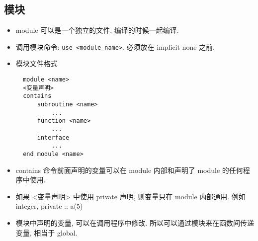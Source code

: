 \subsection{模块}

\begin{itemize}
\item module 可以是一个独立的文件, 编译的时候一起编译.
\item 调用模块命令:  \verb|use <module_name>|.  必须放在 implicit none 之前.
\item 模块文件格式
\begin{lstlisting}
  module <name>
  <变量声明>
  contains
      subroutine <name>
          ...
      function <name>
          ...
      interface
          ...
  end module <name>
\end{lstlisting}
\item contains 命令前面声明的变量可以在 module 内部和声明了 module 的任何程序中使用.
\item 如果 <变量声明> 中使用 private 声明, 则变量只在 module 内部通用. 例如
   integer, private :: a(5)
\item 模块中声明的变量, 可以在调用程序中修改. 所以可以通过模块来在函数间传递变量, 相当于 global.
\end{itemize}
